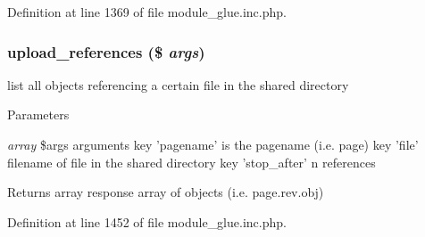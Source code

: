 Definition at line 1369 of file module\_\-glue.inc.php.

\hypertarget{module__glue_8inc_8php_a2099347b9bdf5a5973a13e5f7a4be933}{
\subsubsection[{upload\_\-references}]{\setlength{\rightskip}{0pt plus 5cm}upload\_\-references (\$ {\em args})}}
\label{module__glue_8inc_8php_a2099347b9bdf5a5973a13e5f7a4be933}
list all objects referencing a certain file in the shared directory


\begin{DoxyParams}{Parameters}
\item[{\em array}]\$args arguments key 'pagename' is the pagename (i.e. page) key 'file' filename of file in the shared directory key 'stop\_\-after' n references \end{DoxyParams}
\begin{DoxyReturn}{Returns}
array response array of objects (i.e. page.rev.obj) 
\end{DoxyReturn}


Definition at line 1452 of file module\_\-glue.inc.php.

